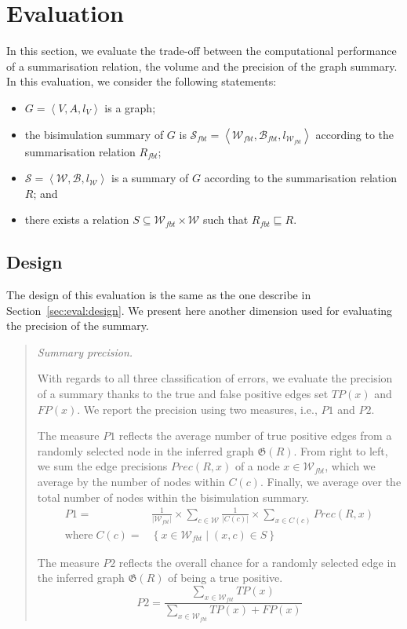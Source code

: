 \section{Evaluation}
\label{sec:eval}

In this section, we evaluate the trade-off between the computational performance of a summarisation relation, the volume and the precision of the graph summary.
In this evaluation, we consider the following statements:
\begin{itemize}
	\item $G=\left\langle V, A, l_V \right\rangle$ is a graph;
	\item the bisimulation summary of $G$ is $\mathcal{S}_{fbt} = \left\langle \mathcal{W}_{fbt}, \mathcal{B}_{fbt}, l_{\mathcal{W}_{fbt}} \right\rangle$ according to the summarisation relation $R_{fbt}$;
	\item $\mathcal{S} = \left\langle \mathcal{W}, \mathcal{B}, l_{\mathcal{W}} \right\rangle$ is a summary of $G$ according to the summarisation relation $R$; and
	\item there exists a relation $S \subseteq \mathcal{W}_{fbt} \times \mathcal{W}$ such that $R_{fbt} \sqsubseteq R$.
\end{itemize}

\subsection{Design}

The design of this evaluation is the same as the one describe in Section~\ref{sec:eval:design}. We present here another dimension used for evaluating the precision of the summary.

\begin{quotation}
\item[\emph{Summary precision.}]

With regards to all three classification of errors, we evaluate the precision of a summary thanks to the true and false positive edges set $TP(x)$ and $FP(x)$.
We report the precision using two measures, i.e., $P1$ and $P2$.

The measure $P1$ reflects the average number of true positive edges from a randomly selected node in the inferred graph $\mathfrak{G}(R)$. From right to left, we sum the edge precisions $Prec(R, x)$ of a node $x\in \mathcal{W}_{fbt}$, which we average by the number of nodes within $C(c)$. Finally, we average over the total number of nodes within the bisimulation summary.
$$
\begin{aligned}
P1 = & \frac{1}{\vert \mathcal{W}_{fbt} \vert} \times \sum_{c \in \mathcal{W}}{\frac{1}{\vert C(c) \vert} \times \sum_{x \in C(c)}{Prec(R, x)}} \\
\text{where}\; C(c) = & \left\lbrace x \in \mathcal{W}_{fbt} \mid (x, c) \in S \right\rbrace
\end{aligned}
$$

The measure $P2$ reflects the overall chance for a randomly selected edge in the inferred graph $\mathfrak{G}(R)$ of being a true positive.
$$
P2 = \frac{\sum_{x \in \mathcal{W}_{fbt}}{TP(x)}}{\sum_{x \in \mathcal{W}_{fbt}}{TP(x) + FP(x)}}
$$
\end{quotation}

